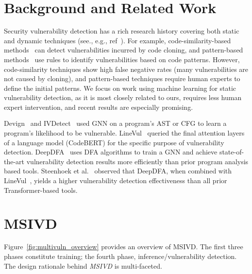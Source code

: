 \documentclass[12pt,openany,oneside,table]{cmuthesis}
\begin{document}
\section{Background and Related Work}

Security vulnerability detection has a rich research history covering both static and dynamic techniques (see., e.g., ref~\cite{sokMemory,secVulSurvey,fuzzingSurvey}). For example, code-similarity-based methods~\cite{vuddy, vulpecker} can detect vulnerabilities incurred by code cloning, and pattern-based methods~\cite{neuhaus2007predicting, chucky} use rules to identify vulnerabilities based on code patterns. However, code-similarity techniques show high false negative rates (many vulnerabilities are not caused by cloning), and pattern-based techniques require human experts to define the initial patterns. We focus on work using machine learning for static vulnerability detection, as it is most closely related to ours, requires less human expert intervention, and recent results are especially promising.

Devign~\cite{zhou2019devign} and IVDetect~\cite{ivdetect} used GNN on a program's AST or CFG to learn a program's likelihood to be vulnerable. LineVul~\cite{linevd} queried the final attention layers of a language model (CodeBERT) for the specific purpose of vulnerability detection. DeepDFA~\cite{deepdfa} uses DFA algorithms to train a GNN and achieve state-of-the-art vulnerability detection results more efficiently than prior program analysis based tools. Steenhoek et al.~\cite{deepdfa} observed that DeepDFA, when combined with LineVul~\cite{linevd}, yields a higher vulnerability detection effectiveness than all prior Transformer-based tools.

\section{MSIVD}

Figure~\ref{fig:multivuln_overview} provides an overview of MSIVD. The first three phases constitute training; the fourth phase, inference/vulnerability detection.
The design rationale behind \textit{MSIVD} is multi-faceted.  
\end{document}
